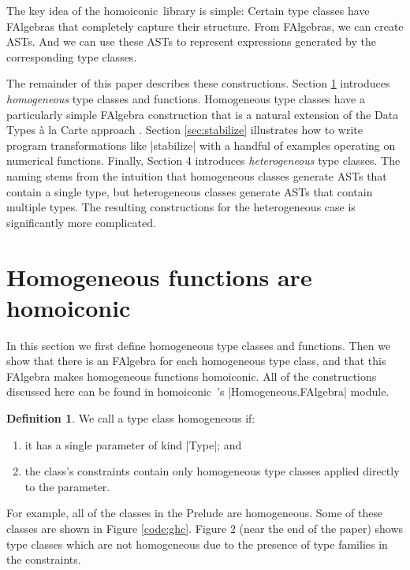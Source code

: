 \documentclass[preprint]{sigplanconf}
\theoremstyle{definition}
\newtheorem{defn}{Definition}
\newcommand{\homoiconic}{{\ttfamily homoiconic}~}
\begin{document}
The key idea of the \homoiconic library is simple:
Certain type classes have FAlgebras that completely capture their structure.
From FAlgebras, we can create ASTs.
And we can use these ASTs to represent expressions generated by the corresponding type classes.

The remainder of this paper describes these constructions.
Section \ref{sec:homogeneous} introduces \emph{homogeneous} type classes and functions.
Homogeneous type classes have a particularly simple FAlgebra construction that is a natural extension of the Data Types \`a la Carte approach \cite{swierstra2008}.
Section \ref{sec:stabilize} illustrates how to write program transformations like |stabilize| with a handful of examples operating on numerical functions.
Finally, Section 4 introduces \emph{heterogeneous} type classes.
The naming stems from the intuition that homogeneous classes generate ASTs that contain a single type,
but heterogeneous classes generate ASTs that contain multiple types.
The resulting constructions for the heterogeneous case is significantly more complicated.

\section{Homogeneous functions are homoiconic}
\label{sec:homogeneous}

In this section we first define homogeneous type classes and functions.
Then we show that there is an FAlgebra for each homogeneous type class,
and that this FAlgebra makes homogeneous functions homoiconic.
All of the constructions discussed here can be found in \homoiconic's |Homogeneous.FAlgebra| module.

\begin{defn}
We call a type class homogeneous if:
\begin{enumerate}
\item
it has a single parameter of kind |Type|; and
\item
the class's constraints contain only homogeneous type classes applied directly to the parameter.
\end{enumerate}
For example, all of the classes in the Prelude are homogeneous.
Some of these classes are shown in Figure \ref{code:ghc}.
Figure 2 (near the end of the paper) shows type classes which are not homogeneous due to the presence of type families in the constraints.
\end{defn}
\end{document}
